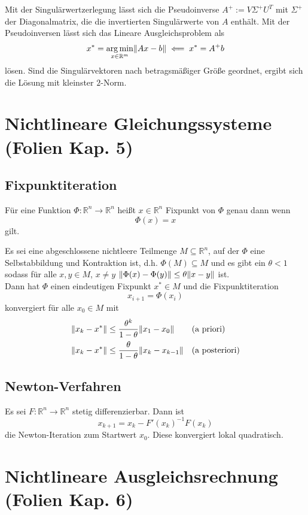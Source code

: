 \documentclass[a4paper,parskip=half*,DIV=7,fontsize=11pt]{scrartcl}
\DeclarePairedDelimiter\norm{\lVert}{\rVert}
\DeclareMathOperator*\argmin{arg\,min}
\begin{document}
Mit der Singulärwertzerlegung lässt sich die Pseudoinverse $A^+ := V\Sigma^+ U^T$ mit $\Sigma^+$ der Diagonalmatrix, die die invertierten Singulärwerte von $A$ enthält. Mit der Pseudoinversen lässt sich das Lineare Ausgleichsproblem als
\[x^\ast = \argmin_{x \in \mathbb{R}^m} \norm*{Ax-b} \impliedby x^\ast = A^+ b\]
lösen. Sind die Singulärvektoren nach betragsmäßiger Größe geordnet, ergibt sich die Lösung mit kleinster $2$-Norm.


\section{Nichtlineare Gleichungssysteme (Folien Kap. 5)}

\subsection{Fixpunktiteration}

Für eine Funktion $\Phi: \mathbb{R}^n \to \mathbb{R}^n$  heißt $x \in \mathbb{R}^n$ Fixpunkt von $\Phi$ genau dann wenn
\[\Phi(x) = x\]
gilt.

Es sei eine abgeschlossene nichtleere Teilmenge $M \subseteq \mathbb{R}^n$, auf der $\Phi$ eine Selbstabbildung und Kontraktion ist, d.h. $\Phi(M) \subseteq M$ und es gibt ein $\theta < 1$ sodass für alle $x,y \in M$, $x \ne y$ $\norm{\Phi(x)-\Phi(y)} \le \theta \norm{x-y}$ ist.	\\
Dann hat $\Phi$ einen eindeutigen Fixpunkt $x^\ast \in M$ und die Fixpunktiteration
\[x_{i+1} = \Phi(x_i)\]
konvergiert für alle $x_0 \in M$ mit
\begin{align*}
	\norm{x_k-x^\ast} &\le \frac{\theta^k}{1-\theta}\norm{x_1-x_0}	&&	\text{(a priori)}	\\
	\norm{x_k-x^\ast} &\le \frac{\theta}{1-\theta} \norm{x_k-x_{k-1}}	&&	\text{(a posteriori)}
\end{align*}

\subsection{Newton-Verfahren}

Es sei $F : \mathbb{R}^n \to \mathbb{R}^n$ stetig differenzierbar. Dann ist
\[x_{k+1} = x_k - F'(x_k)^{-1}F(x_k)\]
die Newton-Iteration zum Startwert $x_0$. Diese konvergiert lokal quadratisch.

\section{Nichtlineare Ausgleichsrechnung (Folien Kap. 6)}
\end{document}
